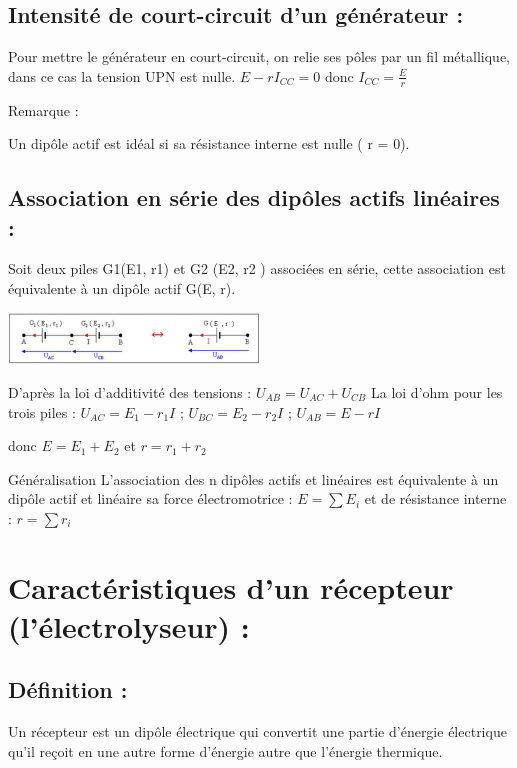 \documentclass[12pt]{article}
\begin{document}
\subsection{Intensité de court-circuit d’un générateur :}
Pour mettre le générateur en court-circuit, on relie ses pôles par un fil métallique, dans ce cas
la tension UPN est nulle.
$E - rI_{CC} = 0$ donc $I_{CC} = \frac{E}{r}$

\begin{tcolorbox}{Remarque :}
  
Un dipôle actif est idéal si sa résistance interne est
nulle ( r = 0).
\end{tcolorbox}
\subsection{Association en série des dipôles actifs linéaires : }
Soit deux piles G1(E1, r1) et G2
(E2, r2 ) associées en série, cette association est équivalente à un dipôle actif G(E, r).

\begin{center}
  \includegraphics[width=0.5\textwidth]{./img/sum_gene.png}
\end{center}
D’après la loi d’additivité des tensions : $U_{AB} = U_{AC} + U_{CB}$
La loi d’ohm pour les trois piles : $U_{AC} = E_1 - r_1I$ ; $U_{BC} = E_2 - r_2I$ ; $U_{AB} = E - rI$

donc $E = E_1 + E_2$ et $r = r_1 + r_2$

\begin{tcolorbox}{Généralisation }
L’association des n dipôles actifs et linéaires est équivalente à un dipôle actif et linéaire sa
force électromotrice : $E = \sum E_i$ et de résistance interne : $r = \sum r_i$
\end{tcolorbox}

\section{ Caractéristiques d’un récepteur (l’électrolyseur) :}
\subsection{ Définition :}
Un récepteur est un dipôle électrique qui convertit une partie d’énergie électrique qu’il reçoit
en une autre forme d’énergie autre que l’énergie thermique.
\end{document}
